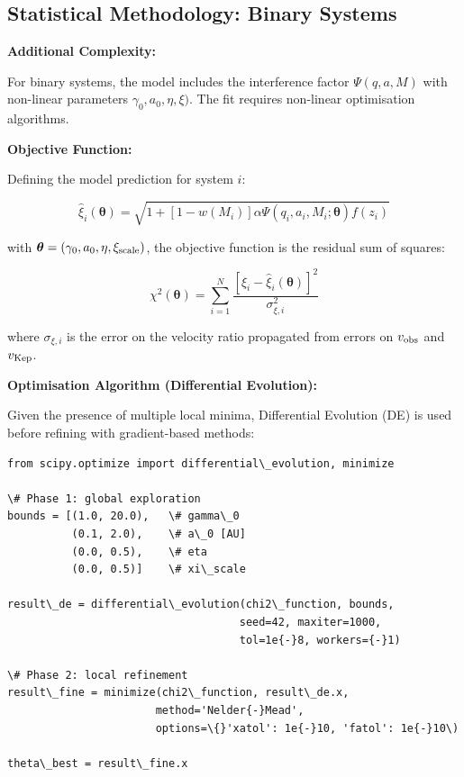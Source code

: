 \documentclass[10pt,a4paper]{article}
\begin{document}
\subsection{Statistical Methodology: Binary
Systems}\label{statistical-methodology-binary-systems}

\textbf{Additional Complexity:}

For binary systems, the model includes the interference factor
\(\Psi(q,a,M)\) with non-linear parameters
\(\gamma_0, a_0, \eta, \xi)\). The fit requires non-linear optimisation
algorithms.

\textbf{Objective Function:}

Defining the model prediction for system \(i\):

\[\hat\xi_i(\boldsymbol\theta) = \sqrt{1 + [1-w(M_i)]\alpha \Psi(q_i,a_i,M_i;\boldsymbol\theta) f(z_i)}\]

with \(\boldsymbol\theta = (\gamma_0, a_0, \eta, \xi_{\rm scale})\), the
objective function is the residual sum of squares:

\[\chi^2(\boldsymbol\theta) = \sum_{i=1}^N \frac{[\xi_i - \hat\xi_i(\boldsymbol\theta)]^2}{\sigma_{\xi,i}^2}\]

where \(\sigma_{\xi,i}\) is the error on the velocity ratio propagated
from errors on \(v_{\rm obs}\) and \(v_{\rm Kep}\).

\textbf{Optimisation Algorithm (Differential Evolution):}

Given the presence of multiple local minima, Differential Evolution (DE)
is used before refining with gradient-based methods:

\begin{lstlisting}
from scipy.optimize import differential\_evolution, minimize

\# Phase 1: global exploration
bounds = [(1.0, 20.0),   \# gamma\_0
          (0.1, 2.0),    \# a\_0 [AU]
          (0.0, 0.5),    \# eta
          (0.0, 0.5)]    \# xi\_scale

result\_de = differential\_evolution(chi2\_function, bounds,
                                    seed=42, maxiter=1000,
                                    tol=1e{-}8, workers={-}1)

\# Phase 2: local refinement
result\_fine = minimize(chi2\_function, result\_de.x,
                       method='Nelder{-}Mead',
                       options=\{}'xatol': 1e{-}10, 'fatol': 1e{-}10\)

theta\_best = result\_fine.x
\end{lstlisting}
\end{document}

